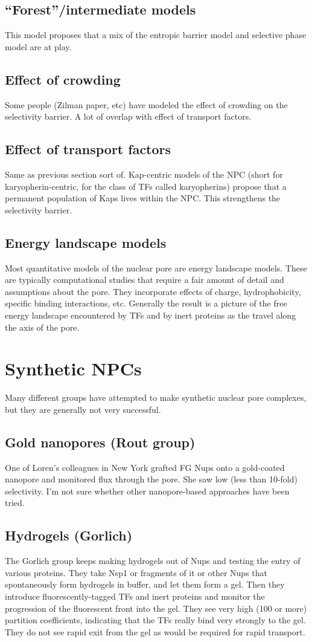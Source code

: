 \subsection{“Forest”/intermediate models}
This model proposes that a mix of the entropic barrier model and selective phase model are at play.
\subsection{Effect of crowding}
Some people (Zilman paper, etc) have modeled the effect of crowding on the selectivity barrier.  A lot of overlap with effect of transport factors.
\subsection{Effect of transport factors}
Same as previous section sort of.  Kap-centric models of the NPC (short for karyopherin-centric, for the class of TFs called karyopherins) propose that a permanent population of Kaps lives within the NPC.  This strengthens the selectivity barrier.
\subsection{Energy landscape models}
Most quantitative models of the nuclear pore are energy landscape models.  These are typically computational studies that require a fair amount of detail and assumptions about the pore.  They incorporate effects of charge, hydrophobicity, specific binding interactions, etc.  Generally the result is a picture of the free energy landscape encountered by TFs and by inert proteins as the travel along the axis of the pore.
\section{Synthetic NPCs}
Many different groups have attempted to make synthetic nuclear pore complexes, but they are generally not very successful.
\subsection{Gold nanopores (Rout group)}
One of Loren's colleagues in New York grafted FG Nups onto a gold-coated nanopore and monitored flux through the pore.  She saw low (less than 10-fold) selectivity.  I'm not sure whether other nanopore-based approaches have been tried.
\subsection{Hydrogels (Gorlich)}
The Gorlich group keeps making hydrogels out of Nups and testing the entry of various proteins.  They take Nsp1 or fragments of it or other Nups that spontaneously form hydrogels in buffer, and let them form a gel.  Then they introduce fluorescently-tagged TFs and inert proteins and monitor the progression of the fluorescent front into the gel.  They see very high (100 or more) partition coefficients, indicating that the TFs really bind very strongly to the gel.  They do not see rapid exit from the gel as would be required for rapid transport.

